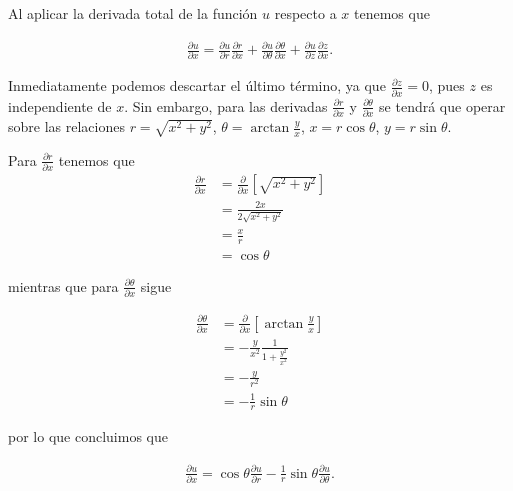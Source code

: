 \documentclass[letter]{tufte-handout} %
\begin{document}
Al aplicar la derivada total de la función $u$ respecto a $x$ tenemos que

\begin{align}
	\frac{\partial u}{\partial x} = \frac{\partial u}{\partial r}\frac{\partial r}{\partial x} +
	\frac{\partial u}{\partial \theta}\frac{\partial \theta}{\partial x} + \frac{\partial u}{\partial z}\frac{\partial z}{\partial x}\text{.}
\end{align}

Inmediatamente podemos descartar el último término, ya que $\frac{\partial z}{\partial x} = 0$, pues $z$ es independiente de $x$.
Sin embargo, para las derivadas $\frac{\partial r}{\partial x}$ y $\frac{\partial \theta}{\partial x}$ se tendrá que operar
sobre las relaciones $r = \sqrt{x^2 + y^2}$, $\theta = \arctan{\frac{y}{x}}$, $x = r\cos{\theta}$, $y=r\sin{\theta}$.

Para $\frac{\partial r}{\partial x}$ tenemos que
\begin{align*}
	\frac{\partial r}{\partial x} & = \frac{\partial}{\partial x}\left[\sqrt{x^2 + y^2}\right] \\
	                              & = \frac{2x}{2\sqrt{x^2 + y^2}}                             \\
	                              & = \frac{x}{r}                                              \\
	                              & = \cos{\theta}
\end{align*}

mientras que para $\frac{\partial \theta}{\partial x}$ sigue

\begin{align*}
	\frac{\partial \theta}{\partial x} & = \frac{\partial}{\partial x}\left[ \arctan{\frac{y}{x}} \right] \\
	                                   & = -\frac{y}{x^2}\frac{1}{1 + \frac{y^2}{x^2}}                    \\
	                                   & = -\frac{y}{r^2}                                                 \\
	                                   & = -\frac{1}{r}\sin{\theta}
\end{align*}

por lo que concluimos que

\begin{align}
	\frac{\partial u}{\partial x} = \cos{\theta}\frac{\partial u}{\partial r} - \frac{1}{r}\sin{\theta}\frac{\partial u}{\partial \theta}\text{.}
\end{align}
\end{document}
